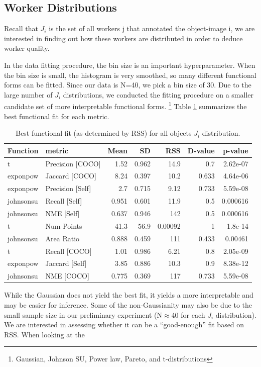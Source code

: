 \documentclass[12pt]{article}
\begin{document}
\subsection{Worker Distributions}
\par Recall that $J_i$  is the set of all workers j that annotated the object-image i, we are interested in finding out how these workers are distributed in order to deduce worker quality. 
\par In the data fitting procedure, the bin size is an important hyperparameter. When the bin size is small, the histogram is very smoothed, so many different functional forms can be fitted. Since our data is N=40, we pick a bin size of 30. Due to the large number of $J_i$ distributions, we conducted the fitting procedure on a smaller candidate set of more interpretable functional forms.
\footnote{Gaussian, Johnson SU, Power law, Pareto, and t-distributions} Table \ref{all_Ji_fit} summarizes the best functional fit for each metric. 
\begin{table}[ht]
\centering
\begin{tabular}{llrrrrr}
\hline
 Function   & metric           &   Mean &     SD &       RSS &   D-value &   p-value \\
\hline
 t          & Precision [COCO] &  1.52  &  0.962 &  14.9     &     0.7   &  2.62e-07 \\
 exponpow   & Jaccard [COCO]   &  8.24  &  0.397 &  10.2     &     0.633 &  4.64e-06 \\
 exponpow   & Precision [Self] &  2.7   &  0.715 &   9.12    &     0.733 &  5.59e-08 \\
 johnsonsu  & Recall [Self]    &  0.951 &  0.601 &  11.9     &     0.5   &  0.000616 \\
 johnsonsu  & NME [Self]       &  0.637 &  0.946 & 142       &     0.5   &  0.000616 \\
 t          & Num Points       & 41.3   & 56.9   &   0.00092 &     1     &  1.8e-14  \\
 johnsonsu  & Area Ratio       &  0.888 &  0.459 & 111       &     0.433 &  0.00461  \\
 t          & Recall [COCO]    &  1.01  &  0.986 &   6.21    &     0.8   &  2.05e-09 \\
 exponpow   & Jaccard [Self]   &  3.85  &  0.886 &  10.3     &     0.9   &  8.38e-12 \\
 johnsonsu  & NME [COCO]       &  0.775 &  0.369 & 117       &     0.733 &  5.59e-08 \\
\hline
\end{tabular}
\caption{Best functional fit (as determined by RSS) for all objects $J_i$ distribution.}
\label{all_Ji_fit}
\end{table}
While the Gaussian does not yield the best fit, it yields a more interpretable and may be easier for inference. Some of the non-Gaussianity may also be due to the small sample size in our preliminary experiment (N$\approx$40 for each $J_i$ distribution). We are interested in  assessing whether it can be a ``good-enough'' fit based on RSS. When looking at the 
\end{document}
